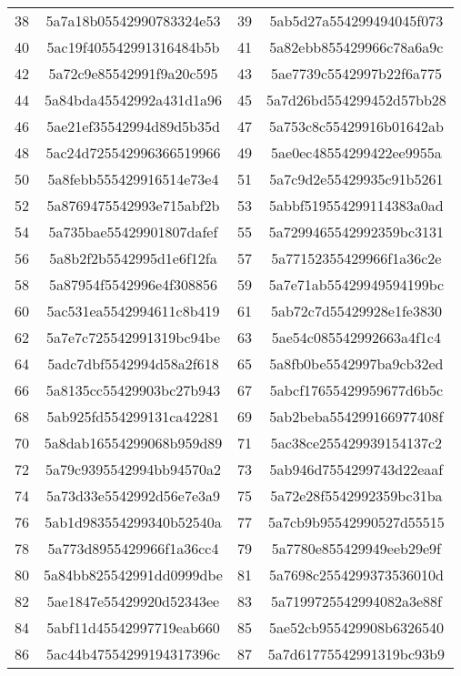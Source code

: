 \documentclass[11pt,a4paper]{article}
\begin{document}
\begin{table*}[t!]
\begin{tabular}{lclc}
38 & 5a7a18b05542990783324e53 & 39 & 5ab5d27a554299494045f073 \\
40 & 5ac19f405542991316484b5b & 41 & 5a82ebb855429966c78a6a9c \\
42 & 5a72c9e85542991f9a20c595 & 43 & 5ae7739c5542997b22f6a775 \\
44 & 5a84bda45542992a431d1a96 & 45 & 5a7d26bd554299452d57bb28 \\
46 & 5ae21ef35542994d89d5b35d & 47 & 5a753c8c55429916b01642ab \\
48 & 5ac24d725542996366519966 & 49 & 5ae0ec48554299422ee9955a \\
50 & 5a8febb555429916514e73e4 & 51 & 5a7c9d2e55429935c91b5261 \\
52 & 5a8769475542993e715abf2b & 53 & 5abbf519554299114383a0ad \\
54 & 5a735bae55429901807dafef & 55 & 5a7299465542992359bc3131 \\
56 & 5a8b2f2b5542995d1e6f12fa & 57 & 5a77152355429966f1a36c2e \\
58 & 5a87954f5542996e4f308856 & 59 & 5a7e71ab55429949594199bc \\
60 & 5ac531ea5542994611c8b419 & 61 & 5ab72c7d55429928e1fe3830 \\
62 & 5a7e7c725542991319bc94be & 63 & 5ae54c085542992663a4f1c4 \\
64 & 5adc7dbf5542994d58a2f618 & 65 & 5a8fb0be5542997ba9cb32ed \\
66 & 5a8135cc55429903bc27b943 & 67 & 5abcf17655429959677d6b5c \\
68 & 5ab925fd554299131ca42281 & 69 & 5ab2beba554299166977408f \\
70 & 5a8dab16554299068b959d89 & 71 & 5ac38ce255429939154137c2 \\
72 & 5a79c9395542994bb94570a2 & 73 & 5ab946d7554299743d22eaaf \\
74 & 5a73d33e5542992d56e7e3a9 & 75 & 5a72e28f5542992359bc31ba \\
76 & 5ab1d983554299340b52540a & 77 & 5a7cb9b95542990527d55515 \\
78 & 5a773d8955429966f1a36cc4 & 79 & 5a7780e855429949eeb29e9f \\
80 & 5a84bb825542991dd0999dbe & 81 & 5a7698c2554299373536010d \\
82 & 5ae1847e55429920d52343ee & 83 & 5a7199725542994082a3e88f \\
84 & 5abf11d45542997719eab660 & 85 & 5ae52cb955429908b6326540 \\
86 & 5ac44b47554299194317396c & 87 & 5a7d61775542991319bc93b9 \\

\end{tabular}
\end{table*}
\end{document}
